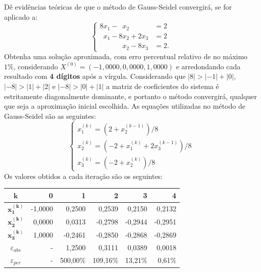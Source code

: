 \documentclass[12pt,a4paper]{article}
\begin{document}
\begin{ExerciseList}
\Exercise[title={2,0}]
Dê evidências teóricas de que o método de Gauss-Seidel convergirá, se for aplicado a:
\[
\begin{cases}
8x_1-\phantom{1}x_2\phantom{+ 0 x_3 } &= 2\\
\phantom{1}x_1-8x_2+2x_3 &= 2\\
\phantom{0x_1+1}x_2-8x_3 &= 2.
\end{cases}
\]
Obtenha uma solução aproximada, com erro percentual relativo de no máximo $1\%$, considerando $X^{(0)} = (-1,0000, 0,0000, 1,0000)$ e arredondando cada resultado com \textbf{4 dígitos} após a vírgula.
\Answer Considerando que
$|8| > |-1|+|0|$,
$|-8| > |1|+|2|$ e
$|-8| > |0|+|1|$
a matriz de coeficientes do sistema é estritamente diagonalmente dominante, e portanto o método convergirá, qualquer que seja a aproximação inicial escolhida. As equações utilizadas no método de Gauss-Seidel são as seguintes:
\[
\begin{cases}
x_1^{(k)} = (2 + x_2^{(k-1)})/8\\
x_2^{(k)} = (-2 + x_1^{(k)} + 2x_3^{(k-1)})/8\\
x_3^{(k)} = (-2 + x_2^{(k)})/8
\end{cases}
\]
Os valores obtidos a cada iteração são os seguintes:
\medskip
\begin{center}
\begin{tabular}{|c|r|r|r|r|r|}
\hline
$\boldsymbol{k}$     & 0 & 1 & 2 & 3 & 4\\
\hline
$\boldsymbol{x_1^{(k)}}$ & -1,0000 &  0,2500 &  0,2539 &  0,2150 &  0,2132 \\
\hline
$\boldsymbol{x_2^{(k)}}$ &  0,0000 &  0,0313 & -0,2798 & -0,2944 & -0,2951 \\
\hline
$\boldsymbol{x_3^{(k)}}$ &  1,0000 & -0,2461 & -0,2850 & -0,2868 & -0,2869 \\
\hline
$\varepsilon_{abs}$ & - & 1,2500 & 0,3111 & 0,0389 & 0,0018 \\
\hline
$\varepsilon_{per}$ & - & 500,00\% & 109,16\% & 13,21\% & 0,61\% \\
\hline
\end{tabular}
\end{center}
\medskip



\end{ExerciseList}
\end{document}
